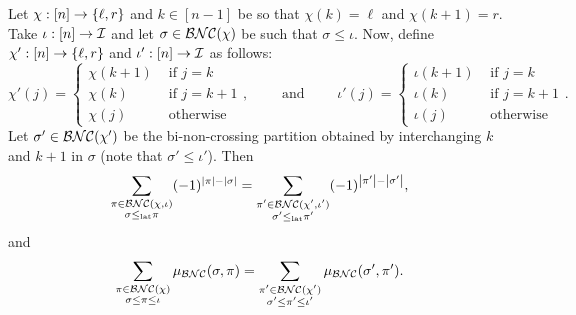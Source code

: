 \begin{lemma}
	\label{lem:leftdownrightup}
	Let $\chi: [n] \to \left\{\ell, r\right\}$ and $k \in [n-1]$ be so that $\chi(k) = \ell$ and $\chi(k+1) = r$.
	Take $\iota : [n] \to \mathcal{I}$ and let $\sigma \in \mathcal{BNC}(\chi)$ be such that $\sigma \leq \iota$.
	Now, define $\chi' : [n] \to \left\{\ell, r\right\}$ and $\iota' : [n] \to \mathcal{I}$ as follows:
	$$
	\chi'(j) = \left\{\begin{array}{ll} \chi(k+1) & \text{ if } j = k \\
		\chi(k) & \text{ if } j = k + 1 \\
	\chi(j) & \text{ otherwise} \end{array}\right.,
	\qquad\text{ and }\qquad
	\iota'(j) = \left\{\begin{array}{ll} \iota(k+1) & \text{ if } j = k \\
		\iota(k) & \text{ if } j = k + 1 \\
	\iota(j) & \text{ otherwise} \end{array}\right..
	$$
	Let $\sigma' \in \mathcal{BNC}(\chi')$ be the bi-non-crossing partition obtained by interchanging $k$ and $k+1$ in $\sigma$ (note that $\sigma' \leq \iota'$).
	Then
	$$\sum_{\substack{\pi\in\mathcal{BNC}(\chi, \iota)\\\sigma\leq_{{\operatorname{lat}}}\pi}} (-1)^{\left|\pi\right| - \left|\sigma\right|}
	= \sum_{\substack{\pi' \in \mathcal{BNC}(\chi', \iota') \\ \sigma' \leq_{{\operatorname{lat}}} \pi'}} (-1)^{\left|\pi'\right|-\left|\sigma'\right|},$$
	and
	$$\sum_{\substack{\pi \in \mathcal{BNC}(\chi) \\ \sigma \leq \pi \leq \iota}} \mu_{\mathcal{BNC}}(\sigma, \pi)
	= \sum_{\substack{\pi' \in \mathcal{BNC}(\chi') \\ \sigma' \leq \pi' \leq \iota'}} \mu_{\mathcal{BNC}}(\sigma', \pi').$$
\end{lemma}


